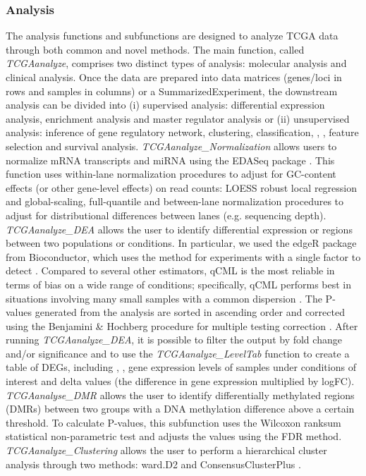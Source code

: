 \subsubsection*{Analysis}
The analysis functions and subfunctions are designed to analyze TCGA data through both common and novel methods.
The main function, called \textit{TCGAanalyze}, comprises two distinct types of analysis: molecular analysis and clinical analysis. Once the data are prepared into data matrices
(genes/loci in rows and samples in columns) or a SummarizedExperiment, the downstream
analysis can be divided into (i) supervised analysis: differential expression analysis, enrichment analysis and master regulator analysis or (ii) unsupervised analysis: inference of gene regulatory network, clustering, classification,  \cite{sonego2008roc}, , feature selection and survival analysis.
\textit{TCGAanalyze\_Normalization} allows users to normalize mRNA transcripts and miRNA using the EDASeq package \cite{risso2011gc}. This function uses within-lane normalization procedures to adjust for GC-content effects (or other gene-level effects) on read counts: LOESS robust local regression and global-scaling, full-quantile and between-lane normalization procedures to adjust for distributional differences between lanes (e.g. sequencing depth).
\textit{TCGAanalyze\_DEA} allows the user to identify differential expression or regions between two populations or conditions.
In particular, we used the edgeR package from
Bioconductor, which uses the  method for experiments with
a single factor to detect  \cite{robinson2010edger}. Compared to several other estimators, qCML is the most reliable in terms of bias on a wide range of conditions; specifically, qCML performs best in situations involving many small samples with a common dispersion \cite{robinson2007small}. The P-values generated from the analysis are sorted in ascending order and corrected using the Benjamini \& Hochberg procedure for multiple testing correction \cite{Ben95}.
After running \textit{TCGAanalyze\_DEA}, it is possible to filter the output by fold change and/or significance and to use the \textit{TCGAanalyze\_LevelTab} function to create a table of DEGs, including , , gene expression levels of samples under conditions of interest and delta values (the difference in gene expression multiplied by logFC).
\textit{TCGAanalyse\_DMR} allows the user to identify differentially methylated regions (DMRs) between two groups with a DNA methylation difference above a certain threshold. To calculate P-values, this subfunction uses the Wilcoxon ranksum statistical non-parametric test and adjusts the values using the FDR method.
\textit{TCGAanalyze\_Clustering} allows the user to perform a hierarchical cluster analysis through two methods: ward.D2 and ConsensusClusterPlus \cite{wilkerson2010consensusclusterplus}.


